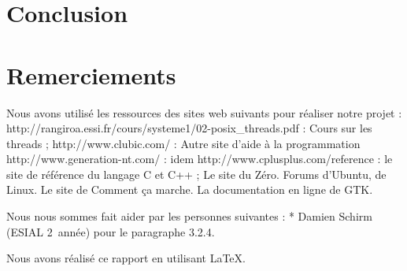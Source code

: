 \documentclass[a4paper, 12pt]{article}
\begin{document}
\section{Conclusion}

\appendix
\section{Remerciements}
Nous avons utilisé les ressources des sites web suivants pour réaliser notre projet :\newline
http://rangiroa.essi.fr/cours/systeme1/02-posix\_threads.pdf : Cours sur les threads ; \newline
http://www.clubic.com/ : Autre site d'aide à la programmation \newline
http://www.generation-nt.com/ : idem \newline
http://www.cplusplus.com/reference : le site de référence du langage C et C++ ;\newline
Le site du Zéro. \newline
Forums d'Ubuntu, de Linux. \newline
Le site de Comment ça marche. \newline
La documentation en ligne de GTK. \newline

Nous nous sommes fait aider par les personnes suivantes : \newline
* Damien Schirm (ESIAL 2\ieme\ année) pour le paragraphe 3.2.4. \newline
 
Nous avons réalisé ce rapport en utilisant \LaTeX.
\end{document}
